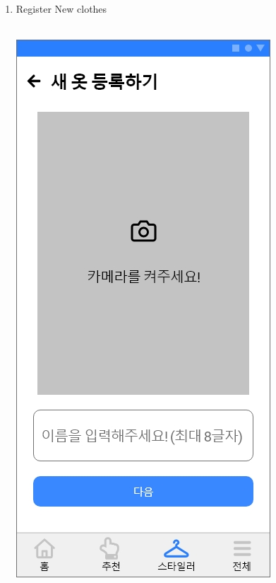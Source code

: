 \documentclass[conference]{IEEEtran}
\begin{document}
\begin{enumerate}
 \item Register New clothes\\ \\
 \begin{enumerate}
    \centerline{\includegraphics[scale=0.24]{assets/새 옷 등록하기1.jpg}
}
\end{enumerate}
\end{enumerate}
\end{document}
